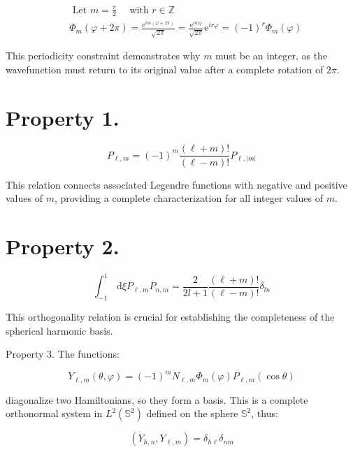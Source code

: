 \documentclass[italian]{HKNdocument}
\begin{document}
\begin{align}
& \text { Let } m=\frac{r}{2} \quad \text { with } r \in \mathbb{Z} \\
& \Phi_{m}(\varphi+2 \pi)=\frac{\mathrm{e}^{i m(\varphi+2 \pi)}}{\sqrt{2 \pi}}=\frac{\mathrm{e}^{i m \varphi}}{\sqrt{2 \pi}} \mathrm{e}^{i r \varphi}=(-1)^{r} \Phi_{m}(\varphi)
\end{align}

This periodicity constraint demonstrates why $m$ must be an integer, as the wavefunction must return to its original value after a complete rotation of $2\pi$.

\section{Property 1.}

\begin{equation}
P_{\ell, m}=(-1)^{m} \frac{(\ell+m)!}{(\ell-m)!} P_{\ell,|m|}
\end{equation}

This relation connects associated Legendre functions with negative and positive values of $m$, providing a complete characterization for all integer values of $m$.

\section{Property 2.}

\begin{equation}
\int_{-1}^{1} \, \mathrm{d} \xi P_{\ell, m} P_{n, m}=\frac{2}{2 l+1} \frac{(\ell+m)!}{(\ell-m)!} \delta_{l n}
\end{equation}

This orthogonality relation is crucial for establishing the completeness of the spherical harmonic basis.

Property 3. The functions:

\begin{equation}
Y_{\ell, m}(\theta, \varphi)=(-1)^{m} N_{\ell, m} \Phi_{m}(\varphi) P_{\ell, m}(\cos \theta)
\end{equation}

diagonalize two Hamiltonians, so they form a basis. This is a complete orthonormal system in $L^{2}\left(\mathbb{S}^{2}\right)$ defined on the sphere $\mathbb{S}^{2}$, thus:

\begin{equation}
\left(Y_{h, n}, Y_{\ell, m}\right)=\delta_{h \ell} \delta_{n m}
\end{equation}
\end{document}
